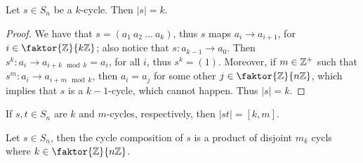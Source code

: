 \begin{lemma}\label{lemma_1.3.6}
  Let $s \in S_n$ be a $k$-cycle. Then $|s|=k$.
\end{lemma}
\begin{proof}
  We have that $s=(a_1 \ a_2 \ \dots \ a_k)$, thus $s$ maps  $a_i
  \rightarrow a_{i+1}$, for $i \in \faktor{\Z}{k\Z}$; also notice that
  $s:a_{k-1} \rightarrow a_0$. Then $s^k:a_i \rightarrow a_{i+k
  \mod{k}}=a_i$, for all  $i$, thus  $s^k=(1)$. Moreover, if $m \in \mathbb{Z}^+$
  such that $s^m:a_i \rightarrow a_{i+m \mod{k}}$, then $a_i=a_j$ for
  some other  $j \in \faktor{\Z}{n\Z}$, which implies that $s$ is a
  $k-1$-cycle, which cannot happen. Thus $|s|=k$.
\end{proof}
\begin{corollary}
  If $s,t \in S_n$ are  $k$ and $m$-cycles, respectively, then
  $|st|=[k,m]$.
\end{corollary}
\begin{corollary}
  Let $s \in S_n$, then the cycle composition of  $s$ is a product of disjoint
  $m_k$ cycls where $k \in \faktor{\Z}{n\Z}$.
\end{corollary}
